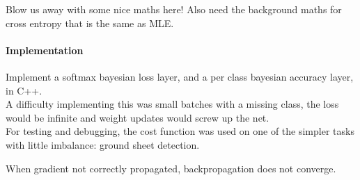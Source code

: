 \documentclass[a4paper,11pt]{article}
\begin{document}
Blow us away with some nice maths here! Also need the background maths for cross entropy that is the same as MLE. \\


\paragraph{Implementation}

Implement a softmax bayesian loss layer, and a per class bayesian accuracy layer, in C++. \\

A difficulty implementing this was small batches with a missing class, the loss would be infinite and weight updates would screw up the net. \\

For testing and debugging, the cost function was used on one of the simpler tasks with little imbalance: ground sheet detection. 

When gradient not correctly propagated, backpropagation does not converge. \\
\end{document}
